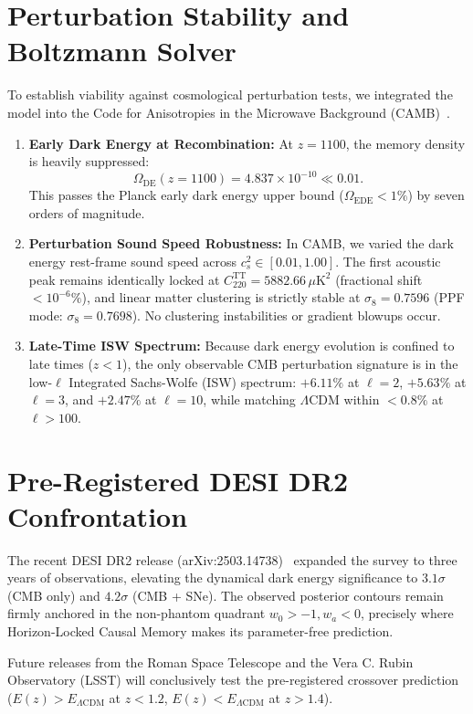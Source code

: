 \documentclass[10pt,twocolumn]{article}
\begin{document}
\section{Perturbation Stability and Boltzmann Solver}
To establish viability against cosmological perturbation tests, we integrated the model into the Code for Anisotropies in the Microwave Background (CAMB)~\cite{lewis2000}.
\begin{enumerate}
\item \textbf{Early Dark Energy at Recombination:} At $z = 1100$, the memory density is heavily suppressed:
\begin{equation}
\Omega_{\mathrm{DE}}(z=1100) = 4.837 \times 10^{-10} \ll 0.01.
\end{equation}
This passes the Planck early dark energy upper bound ($\Omega_{\mathrm{EDE}} < 1\%$) by seven orders of magnitude.
\item \textbf{Perturbation Sound Speed Robustness:} In CAMB, we varied the dark energy rest-frame sound speed across $c_s^2 \in [0.01, 1.00]$. The first acoustic peak remains identically locked at $C_{220}^{\mathrm{TT}} = 5882.66\,\mu\mathrm{K}^2$ (fractional shift $< 10^{-6}\%$), and linear matter clustering is strictly stable at $\sigma_8 = 0.7596$ (PPF mode: $\sigma_8 = 0.7698$). No clustering instabilities or gradient blowups occur.
\item \textbf{Late-Time ISW Spectrum:} Because dark energy evolution is confined to late times ($z < 1$), the only observable CMB perturbation signature is in the low-$\ell$ Integrated Sachs-Wolfe (ISW) spectrum: $+6.11\%$ at $\ell=2$, $+5.63\%$ at $\ell=3$, and $+2.47\%$ at $\ell=10$, while matching $\Lambda$CDM within $<0.8\%$ at $\ell > 100$.
\end{enumerate}

\section{Pre-Registered DESI DR2 Confrontation}
The recent DESI DR2 release (arXiv:2503.14738)~\cite{desi2025} expanded the survey to three years of observations, elevating the dynamical dark energy significance to $3.1\sigma$ (CMB only) and $4.2\sigma$ (CMB + SNe). The observed posterior contours remain firmly anchored in the non-phantom quadrant $w_0 > -1, w_a < 0$, precisely where Horizon-Locked Causal Memory makes its parameter-free prediction.

Future releases from the Roman Space Telescope and the Vera C. Rubin Observatory (LSST) will conclusively test the pre-registered crossover prediction ($E(z) > E_{\Lambda\mathrm{CDM}}$ at $z < 1.2$, $E(z) < E_{\Lambda\mathrm{CDM}}$ at $z > 1.4$).
\end{document}
